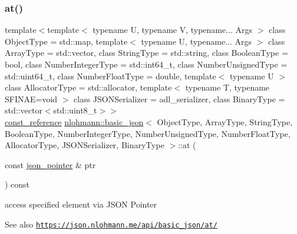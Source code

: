 \subsubsection{\texorpdfstring{at()}{at()}\hspace{0.1cm}{\footnotesize\ttfamily [6/6]}}
{\footnotesize\ttfamily template$<$template$<$ typename U, typename V, typename... Args $>$ class Object\+Type = std\+::map, template$<$ typename U, typename... Args $>$ class Array\+Type = std\+::vector, class String\+Type  = std\+::string, class Boolean\+Type  = bool, class Number\+Integer\+Type  = std\+::int64\+\_\+t, class Number\+Unsigned\+Type  = std\+::uint64\+\_\+t, class Number\+Float\+Type  = double, template$<$ typename U $>$ class Allocator\+Type = std\+::allocator, template$<$ typename T, typename S\+F\+I\+N\+A\+E=void $>$ class J\+S\+O\+N\+Serializer = adl\+\_\+serializer, class Binary\+Type  = std\+::vector$<$std\+::uint8\+\_\+t$>$$>$ \\
\hyperlink{classnlohmann_1_1basic__json_ab8a1c33ee7b154fc41ca2545aa9724e6}{const\+\_\+reference} \hyperlink{classnlohmann_1_1basic__json}{nlohmann\+::basic\+\_\+json}$<$ Object\+Type, Array\+Type, String\+Type, Boolean\+Type, Number\+Integer\+Type, Number\+Unsigned\+Type, Number\+Float\+Type, Allocator\+Type, J\+S\+O\+N\+Serializer, Binary\+Type $>$\+::at (\begin{DoxyParamCaption}\item[{const \hyperlink{classnlohmann_1_1basic__json_aa8f1f93b32da01b42413643be32b2c27}{json\+\_\+pointer} \&}]{ptr }\end{DoxyParamCaption}) const\hspace{0.3cm}{\ttfamily [inline]}}



access specified element via J\+S\+ON Pointer 

\begin{DoxySeeAlso}{See also}
\href{https://json.nlohmann.me/api/basic_json/at/}{\tt https\+://json.\+nlohmann.\+me/api/basic\+\_\+json/at/} 
\end{DoxySeeAlso}
\mbox{\label{classnlohmann_1_1basic__json_a30914ad0767ccdc3633f88a906ed7dfa}} 
